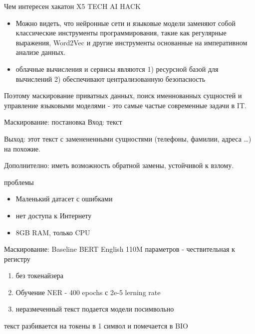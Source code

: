 \documentclass[presentation]{beamer}
\begin{document}
\begin{frame}[label={sec:org1538e68}]{Чем интересен хакатон X5 TECH AI HACK}
\begin{itemize}
\item Можно видеть, что нейронные сети и языковые модели заменяют собой
классические инструменты программирования, такие как регулярные
выражения, Word2Vec и другие инструменты основанные на императивном
анализе данных.
\item облачные вычисления и сервисы являются 1) ресурсной базой для
вычислений 2) обеспечивают централизованную безопасность
\end{itemize}

Поэтому маскирование приватных данных, поиск именнованных сущностей и
 управление языковыми моделями - это самые частые современные задачи в
 IT.
\end{frame}
\begin{frame}[label={sec:org8522c7d}]{Маскирование: постановка}
Вход: текст

Выход: этот текст с заменененными сущностями (телефоны, фамилии,
 адреса \ldots{})  на похожие.

Дополнително: иметь возможность обратной замены, устойчивой к взлому.
\end{frame}
\begin{frame}[label={sec:org48abe90}]{проблемы}
\begin{itemize}
\item Маленький датасет с ошибками
\item нет доступа к Интернету
\item 8GB RAM, только CPU
\end{itemize}
\end{frame}
\begin{frame}[label={sec:orga7b1a1a}]{Маскирование: Baseline}
BERT English 110M параметров - чествительная к регистру
\begin{enumerate}
\item без токенайзера
\item Обучение NER - 400 epochs с 2e-5 lerning rate
\item неразмеченный текст подается модели посимвольно
\end{enumerate}

текст разбивается на токены в 1 символ и помечается в BIO
\end{frame}
\end{document}
